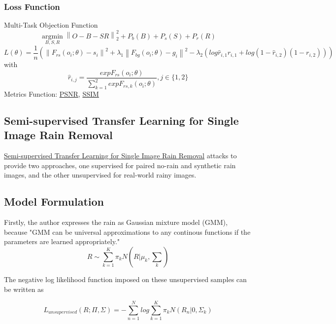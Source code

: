 \documentclass{article}
\newcommand\norm[1]{\left\lVert#1\right\rVert}
\begin{document}
\subsubsection{Loss Function}
Multi-Task Objection Function
\begin{equation}
\operatorname*{argmin}_{B,S,R}\norm{O-B-SR}_2^2+P_b(B)+P_s(S)+P_r(R)
\end{equation}
\begin{equation}
L(\theta)=\frac{1}{n}(\norm{F_{rs}(o_i;\theta)-s_i}^2+\lambda_1\norm{F_{bg}(o_i;\theta)-g_i}^2-\lambda_2(log\hat{r}_{i,1}r_{i,1}+log(1-\hat{r}_{i,2})(1-r_{i,2})))
\end{equation}
with 
\begin{equation}
\hat{r}_{i,j}=\frac{exp{F_{rs}(o_i;\theta)}}{\sum_{k=1}^{2}exp{F_{rs,k}(o_i;\theta)}},j\in{\{1,2\}}
\end{equation}
Metrics Function: \href{https://en.wikipedia.org/wiki/Peak_signal-to-noise_ratio}{PSNR}, \href{https://en.wikipedia.org/wiki/Structural_similarity}{SSIM}
\subsection{Semi-supervised Transfer Learning for Single Image Rain Removal}
\href{https://arxiv.org/pdf/1807.11078.pdf}{Semi-supervised Transfer Learning for Single Image Rain Removal} attacks to provide two approaches, one supervised for paired no-rain and synthetic rain images, and the other unsupervised for real-world rainy images.
\subsection{Model Formulation}
Firstly, the author expresses the rain as Gaussian mixture model (GMM), because "GMM can be universal approximations to any continous functions if the parameters are learned appropriately."
\begin{equation*}
    R \sim  \sum_{k=1}^{K}\pi_{k}N(R \vert \mu_{k}, \sum_{k})
\end{equation*}

The negative log likelihood function imposed on these unsupervised samples can be written as


\begin{equation*}
    L_{unsupervised}(R;\Pi,\Sigma) =-    \sum_{n=1}^{N}log        \sum_{k=1}^{K}\pi_{k}N(R_n \vert 0,\Sigma_{k})
\end{equation*}
\end{document}

